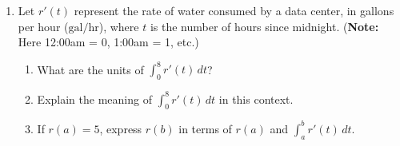 \documentclass[11pt]{article}
\begin{document}
\begin{enumerate}

\newpage

\item Let $r'(t)$ represent the rate of water consumed by a data center, in gallons per hour ($\text{gal/hr}$), where $t$ is the number of hours since midnight. (\textbf{Note:} Here 12:00am = 0, 1:00am = 1, etc.)
    


    \begin{enumerate}[i]
        \item What are the units of $\displaystyle\int_0^8 r'(t) \, dt$?
        \vspace{6cm}

        \item Explain the meaning of $\displaystyle\int_0^8 r'(t) \, dt$ in this context.
       \vspace{6cm}



    \item If $r(a)=5$, express $r(b)$ in terms of $r(a)$ and $\displaystyle \int_a^b r'(t)\,dt$.
\end{enumerate}



\newpage



\end{enumerate}
\end{document}
